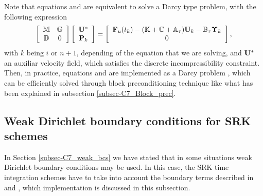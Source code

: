 Note that equations  and  are equivalent to solve a Darcy type problem, with the following expression
\begin{equation}
\label{eq-C7_SRK_upeta_RK_p_darcy}
\left[\begin{array}{cc}
\mathbb{M}&\mathbb{G}\\
\mathbb{D}&0
\end{array}\right]\left[\begin{array}{c}
{\bf U}^*\\
{\bf P}_k
\end{array}\right]=\left[\begin{array}{c}
{\bf F}_u(t_k)-(\mathbb{K}+\mathbb{C}+\mathbb{A}_\tau){\bf U}_k-\mathbb{B}_\tau\boldsymbol{\Upsilon}_k\\
0
\end{array}\right],
\end{equation}
with $k$ being $i$ or $n+1$, depending of the equation that we are solving, and ${\bf U}^*$ an auxiliar velocity field, which satisfies the discrete incompressibility constraint. Then, in practice, equations  and  are implemented as a Darcy problem , which can be efficiently solved through block preconditioning technique like what has been explained in subsection \ref{subsec-C7_Block_prec}.

\subsection{Weak Dirichlet boundary conditions for SRK schemes}
In Section \ref{subsec-C7_weak_bcs} we have stated that in some situations weak Dirichlet boundary conditions may be used. In this case, the SRK time integration schemes have to take into account the boundary terms described in  and , which implementation is discussed in this subsection.

